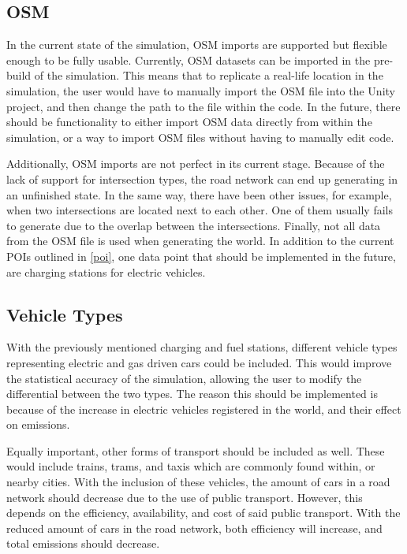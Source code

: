     \subsection{OSM}
        In the current state of the simulation, OSM imports are supported but flexible enough to be fully usable. Currently, OSM datasets can be imported in the pre-build of the simulation. This means that to replicate a real-life location in the simulation, the user would have to manually import the OSM file into the Unity project, and then change the path to the file within the code. In the future, there should be functionality to either import OSM data directly from within the simulation, or a way to import OSM files without having to manually edit code.
        
        Additionally, OSM imports are not perfect in its current stage. Because of the lack of support for intersection types, the road network can end up generating in an unfinished state. In the same way, there have been other issues, for example, when two intersections are located next to each other. One of them usually fails to generate due to the overlap between the intersections. Finally, not all data from the OSM file is used when generating the world. In addition to the current POIs outlined in \ref{poi}, one data point that should be implemented in the future, are charging stations for electric vehicles.

    \subsection{Vehicle Types}
        With the previously mentioned charging and fuel stations, different vehicle types representing electric and gas driven cars could be included. This would improve the statistical accuracy of the simulation, allowing the user to modify the differential between the two types. The reason this should be implemented is because of the increase in electric vehicles registered in the world, and their effect on emissions\cite{IEA}. 
        
        Equally important, other forms of transport should be included as well. These would include trains, trams, and taxis which are commonly found within, or nearby cities. With the inclusion of these vehicles, the amount of cars in a road network should decrease due to the use of public transport. However, this depends on the efficiency, availability, and cost of said public transport. With the reduced amount of cars in the road network, both efficiency will increase, and total emissions should decrease.

